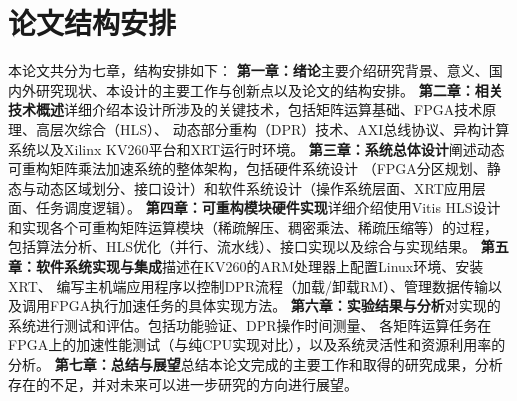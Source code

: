 \section{论文结构安排}

本论文共分为七章，结构安排如下：
\textbf{第一章：绪论}主要介绍研究背景、意义、国内外研究现状、本设计的主要工作与创新点以及论文的结构安排。
\textbf{第二章：相关技术概述}详细介绍本设计所涉及的关键技术，包括矩阵运算基础、FPGA技术原理、高层次综合（HLS）、
动态部分重构（DPR）技术、AXI总线协议、异构计算系统以及Xilinx KV260平台和XRT运行时环境。
\textbf{第三章：系统总体设计}阐述动态可重构矩阵乘法加速系统的整体架构，包括硬件系统设计
（FPGA分区规划、静态与动态区域划分、接口设计）和软件系统设计（操作系统层面、XRT应用层面、任务调度逻辑）。
\textbf{第四章：可重构模块硬件实现}详细介绍使用Vitis HLS设计和实现各个可重构矩阵运算模块（稀疏解压、稠密乘法、稀疏压缩等）的过程，
包括算法分析、HLS优化（并行、流水线）、接口实现以及综合与实现结果。
\textbf{第五章：软件系统实现与集成}描述在KV260的ARM处理器上配置Linux环境、安装XRT、
编写主机端应用程序以控制DPR流程（加载/卸载RM）、管理数据传输以及调用FPGA执行加速任务的具体实现方法。
\textbf{第六章：实验结果与分析}对实现的系统进行测试和评估。包括功能验证、DPR操作时间测量、
各矩阵运算任务在FPGA上的加速性能测试（与纯CPU实现对比），以及系统灵活性和资源利用率的分析。
\textbf{第七章：总结与展望}总结本论文完成的主要工作和取得的研究成果，分析存在的不足，并对未来可以进一步研究的方向进行展望。
